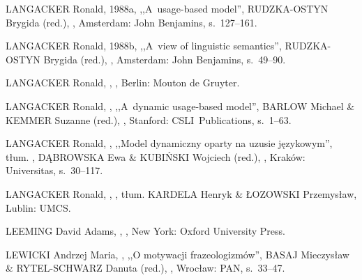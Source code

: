 \documentclass[11pt,a4paper,twoside]{report}
\begin{document}
\begin{thebibliography}{}
{LANGACKER Ronald},
\newblock 1988a,
\newblock ,,A~usage-based model'',
\newblock {[w:]} {RUDZKA-OSTYN Brygida (red.)},
,
\newblock Amsterdam: John Benjamins, %
\newblock s.~127--161.

{LANGACKER Ronald},
\newblock 1988b,
\newblock ,,A~view of linguistic semantics'',
\newblock {[w:]} {RUDZKA-OSTYN Brygida (red.)},
,
\newblock Amsterdam: John Benjamins,
\newblock s.~49--90.

{LANGACKER Ronald},
,
,
\newblock Berlin: Mouton de Gruyter.

{LANGACKER Ronald},
,
\newblock ,,A~dynamic usage-based model'',
\newblock {[w:]} {BARLOW Michael \linebreak \& KEMMER Suzanne (red.)},
,
\newblock Stanford: CSLI~Publications,
\newblock s.~1--63.

{LANGACKER Ronald},
,
\newblock ,,Model dynamiczny oparty na uzusie językowym'',
\newblock tłum. ,
\newblock {[w:]} {DĄBROWSKA Ewa \& KUBIŃSKI Wojciech (red.)},
,
\newblock Kraków: Universitas, 
\newblock s.~30--117.

{LANGACKER Ronald},
,
,
\newblock tłum. {KARDELA Henryk \& ŁOZOWSKI Przemysław},
\newblock Lublin: UMCS.

{LEEMING David Adams},
,
,
\newblock New York: Oxford University Press.

{LEWICKI Andrzej Maria},
,
\newblock ,,O motywacji frazeologizmów'',
\newblock {[w:]} {BASAJ Mieczysław \& RYTEL-SCHWARZ Danuta (red.)},
,
\newblock Wrocław: PAN,
\newblock s.~33--47.


\end{thebibliography}
\end{document}
